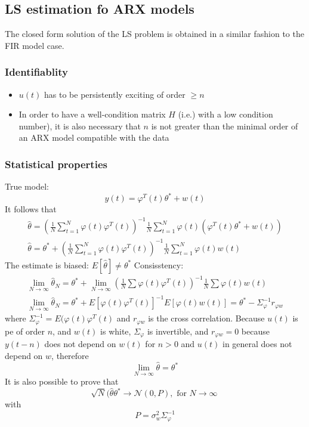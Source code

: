 \documentclass{book}
\theoremstyle{definition}
\theoremstyle{remark}
\theoremstyle{remark}
\begin{document}
\subsection{LS estimation fo ARX models}
The closed form solution of the LS problem is obtained in a similar fashion to the FIR model case.
\subsubsection{Identifiablity}
\begin{itemize}
    \item $u(t)$ has to be persistently exciting of order $\geq n$
    \item In order to have a well-condition matrix $H$ (i.e.) with a low condition number), it is also necessary that $n$ is not greater than the minimal order of an ARX model compatible with the data
\end{itemize}
\subsubsection{Statistical properties}
True model:
\[
    y(t)=\varphi^T(t)\theta^*+w(t)
\]
It follows that
\begin{gather*}
    \hat{\theta} =  \left(\frac{1}{N}\sum_{t=1}^{N}\varphi(t)\varphi^T(t)\right)^{-1} \frac{1}{N}\sum_{t=1}^{N}\varphi(t)\left(\varphi^T(t)\theta^*+w(t)\right)\\
    \hat{\theta} = \theta^* + \left(\frac{1}{N}\sum_{t=1}^{N}\varphi(t)\varphi^T(t)\right)^{-1} \frac{1}{N}\sum_{t=1}^{N}\varphi(t)w(t)
\end{gather*}
The estimate is biased: \( E[\hat{\theta}]\neq \theta^* \)
Consisstency:
\begin{gather*}
    \lim_{N\to\infty} \hat{\theta}_N = \theta^*+\lim_{N\to\infty}\left(\frac{1}{N}\sum \varphi(t)\varphi^T(t)\right)^{-1}\frac{1}{N}\sum \varphi(t)w(t)\\  
    \lim_{N\to\infty} \hat{\theta}_N=\theta^*+E[\varphi(t)\varphi^T(t)]^{-1}E[\varphi(t)w(t)]=\theta^*-\Sigma_{\varphi}^{-1}r_{\varphi w}
\end{gather*}
where $\Sigma_{\varphi}^{-1}=E(\varphi(t)\varphi^T(t)$ and $r_{\varphi w}$ is the cross correlation. 
Because $u(t)$ is pe of order $n$, and $w(t)$ is white, $\Sigma_{\varphi}$ is invertible, and $r_{\varphi w}=0$ because $y(t-n)$ does not depend on $w(t)$ for $n>0$ and $u(t)$ in general does not depend on $w$, therefore
\[
    \lim_{N\to\infty}\hat{\theta}=\theta^*
\]
It is also possible to prove that
\[
    \sqrt{N}(\hat{\theta}\theta^* \to \mathcal{N}(0,P), \text{ for } N\to\infty\
\]
with
\[
    P=\sigma_w^2\Sigma_{\varphi}^{-1}
\]
\end{document}
